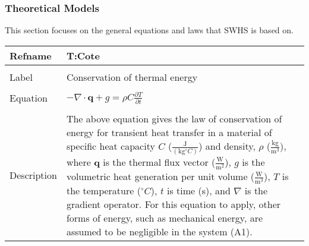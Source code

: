 \documentclass[12pt]{article}
\begin{document}
\subsubsection{Theoretical Models}
\label{Sec:TMs}
This section focuses on the general equations and laws that SWHS is based on.
~\newline
\noindent \begin{minipage}{\textwidth}
\begin{tabular}{p{} p{}}
\toprule \textbf{Refname} & \textbf{T:Cote}
\label{T:Cote}
\\ \midrule \\
Label & Conservation of thermal energy
\\ \midrule \\
Equation & $-\nabla{}\cdot{}\mathbf{q}+g=\rho{}C\frac{\partial{}T}{\partial{}t}$
\\ \midrule \\
Description & The above equation gives the law of conservation of energy for transient heat transfer in a material of specific heat capacity $C$ ($\frac{\text{J}}{(\text{kg}{}^{\circ}C)}$) and density, $\rho{}$ ($\frac{\text{kg}}{\text{m}^{3}}$), where $\mathbf{q}$ is the thermal flux vector ($\frac{\text{W}}{\text{m}^{2}}$), $g$ is the volumetric heat generation per unit volume ($\frac{\text{W}}{\text{m}^{3}}$), $T$ is the temperature (${}^{\circ}C$), $t$ is time (s), and $\nabla{}$ is the gradient operator. For this equation to apply, other forms of energy, such as mechanical energy, are assumed to be negligible in the system (A1).
\\ \bottomrule \end{tabular}
\end{minipage}\\
~\newline
\end{document}
